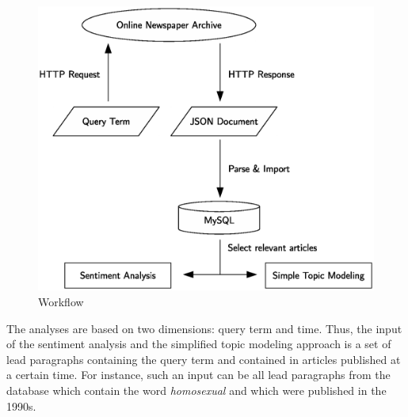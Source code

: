 \documentclass[10pt,a4paper,twocolumn]{scrartcl}
\begin{document}
\begin{figure}
\includegraphics[width=\columnwidth]{figures/workflow_eps}
\caption{Workflow} \label{fig:workflow}
\end{figure}

The analyses are based on two dimensions: query term and time. Thus, the input of the sentiment analysis and the simplified topic modeling approach is a set of lead paragraphs containing the query term and contained in articles published at a certain time. For instance, such an input can be all lead paragraphs from the database which contain the word \textit{homosexual} and which were published in the 1990s.
\end{document}
